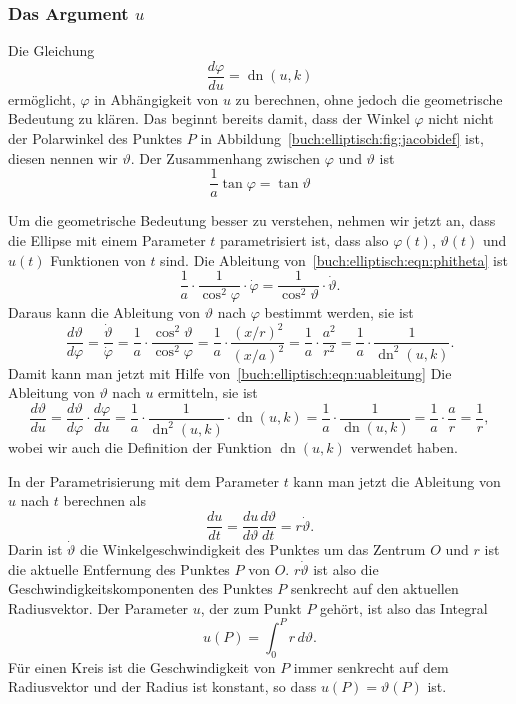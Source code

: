 %
%
\subsubsection{Das Argument $u$}
Die Gleichung 
\begin{equation}
\frac{d\varphi}{du}
=
\operatorname{dn}(u,k)
\label{buch:elliptisch:eqn:uableitung}
\end{equation}
ermöglicht, $\varphi$ in Abhängigkeit von $u$ zu berechnen, ohne jedoch
die geometrische Bedeutung zu klären.
Das beginnt bereits damit, dass der Winkel $\varphi$ nicht nicht der
Polarwinkel des Punktes $P$ in Abbildung~\ref{buch:elliptisch:fig:jacobidef}
ist, diesen nennen wir $\vartheta$.
Der Zusammenhang zwischen $\varphi$ und $\vartheta$ ist
\begin{equation}
\frac1{a}\tan\varphi = \tan\vartheta
\label{buch:elliptisch:eqn:phitheta}
\end{equation}

Um die geometrische Bedeutung besser zu verstehen, nehmen wir jetzt an,
dass die Ellipse mit einem Parameter $t$ parametrisiert ist, dass also
$\varphi(t)$, $\vartheta(t)$ und $u(t)$ Funktionen von $t$ sind.
Die Ableitung von~\eqref{buch:elliptisch:eqn:phitheta} ist
\[
\frac1{a}\cdot \frac{1}{\cos^2\varphi}\cdot \dot{\varphi}
=
\frac{1}{\cos^2\vartheta}\cdot \dot{\vartheta}.
\]
Daraus kann die Ableitung von $\vartheta$ nach $\varphi$ bestimmt
werden, sie ist
\[
\frac{d\vartheta}{d\varphi}
=
\frac{\dot{\vartheta}}{\dot{\varphi}}
=
\frac{1}{a}
\cdot
\frac{\cos^2\vartheta}{\cos^2\varphi}
=
\frac{1}{a}
\cdot
\frac{(x/r)^2}{(x/a)^2}
=
\frac{1}{a}\cdot
\frac{a^2}{r^2}
=
\frac{1}{a}\cdot\frac{1}{\operatorname{dn}^2(u,k)}.
\]
Damit kann man jetzt mit Hilfe von~\eqref{buch:elliptisch:eqn:uableitung} 
Die Ableitung von $\vartheta$ nach $u$ ermitteln, sie ist
\[
\frac{d\vartheta}{du}
=
\frac{d\vartheta}{d\varphi}
\cdot
\frac{d\varphi}{du}
=
\frac{1}{a}\cdot\frac{1}{\operatorname{dn}^2(u,k)}
\cdot
\operatorname{dn}(u,k)
=
\frac{1}{a}
\cdot
\frac{1}{\operatorname{dn}(u,k)}
=
\frac{1}{a}
\cdot\frac{a}{r}
=
\frac{1}{r},
\]
wobei wir auch die Definition der Funktion $\operatorname{dn}(u,k)$
verwendet haben.

In der Parametrisierung mit dem Parameter $t$ kann man jetzt die Ableitung
von $u$ nach $t$ berechnen als
\[
\frac{du}{dt}
=
\frac{du}{d\vartheta}
\frac{d\vartheta}{dt}
=
r
\dot{\vartheta}.
\]
Darin ist $\dot{\vartheta}$ die Winkelgeschwindigkeit des Punktes um
das Zentrum $O$ und $r$ ist die aktuelle Entfernung des Punktes $P$
von $O$.
$r\dot{\vartheta}$ ist also die Geschwindigkeitskomponenten des Punktes
$P$ senkrecht auf den aktuellen Radiusvektor.
Der Parameter $u$, der zum Punkt $P$ gehört, ist also das Integral
\[
u(P) = \int_0^P r\,d\vartheta.
\]
Für einen Kreis ist die Geschwindigkeit von $P$ immer senkrecht
auf dem Radiusvektor und der Radius ist konstant, so dass
$u(P)=\vartheta(P)$ ist.

